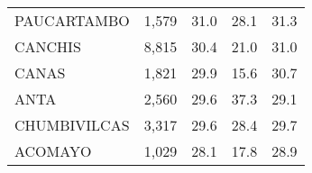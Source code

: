 \begin{tabular}{lrrrr}
	\cellcolor[HTML]{FD6864}PAUCARTAMBO                                     & 1,579                                                                 & 31.0                                                                             & 28.1                                                                        & 31.3                                                                                \\
	\cellcolor[HTML]{FD6864}CANCHIS                                         & 8,815                                                                 & 30.4                                                                             & 21.0                                                                        & 31.0                                                                                \\
	\cellcolor[HTML]{FD6864}CANAS                                           & 1,821                                                                 & 29.9                                                                             & 15.6                                                                        & 30.7                                                                                \\
	\cellcolor[HTML]{FD6864}ANTA                                            & 2,560                                                                 & 29.6                                                                             & 37.3                                                                        & 29.1                                                                                \\
	\cellcolor[HTML]{FD6864}CHUMBIVILCAS                                    & 3,317                                                                 & 29.6                                                                             & 28.4                                                                        & 29.7                                                                                \\
	\cellcolor[HTML]{FD6864}ACOMAYO                                         & 1,029                                                                 & 28.1                                                                             & 17.8                                                                        & 28.9                                                                                \\

\end{tabular}
